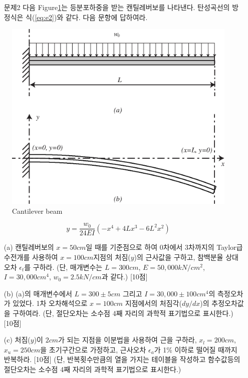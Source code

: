 \documentclass[a4,10pt]{article}
\theoremstyle{examplestyle}
\begin{document}
\begin{itemize}
\item[문제2] 다음 Figure\ref{fig:e2}는 등분포하중을 받는 캔틸레버보를 나타낸다. 탄성곡선의 방정식은 식(\ref{eq:e2})와 같다. 다음 문항에 답하여라.
\end{itemize}
\begin{figure}[!hbpt]
\centering
\includegraphics[keepaspectratio=true,width=0.6\linewidth]{midterm/2.eps}
\caption{Cantilever beam}
\label{fig:e2}
\end{figure}

\begin{equation}\label{eq:e2}
y=\frac{w_{0}}{24EI}\left(-x^4+4Lx^3-6L^2 x^2\right)
\end{equation}
\begin{itemize}
\item[(a)] 캔틸레버보의 $x=50cm$일 때를 기준점으로 하여 0차에서 3차까지의 Taylor급수전개를 사용하여 $x=100cm$지점의 처짐($y$)의 근사값을 구하고, 참백분율 상대오차 $\epsilon_{t}$를 구하라. (단, 매개변수는 $L=300cm$, $E=50,000kN/cm^2$, $I=30,000cm^4$, $w_{0}=2.5kN/cm$과 같다.) [10점]
\item[(b)] (a)의 매개변수에서 $L=300\pm5cm$ 그리고 $I=30,000\pm100cm^4$의 측정오차가 있었다. 1차 오차해석으로 $x=100cm$ 지점에서의 처짐각($dy/dx$)의 추정오차값을 구하여라. (단, 절단오차는 소수점 4째 자리의 과학적 표기법으로 표시한다.) [10점]
\item[(c)] 처짐($y$)이 $2cm$가 되는 지점을 이분법을 사용하여 근을 구하라, $x_{l}=200cm$, $x_{u}=250cm$을 초기구간으로 가정하고, 근사오차 $\epsilon_{a}$가 1\% 이하로 떨어질 때까지 반복하라. [10점] (단, 반복횟수만큼의 열을 가지는 테이블을 작성하고 함수값등의 절단오차는 소수점 4째 자리의 과학적 표기법으로 표시한다.)
\end{itemize}
\end{document}
